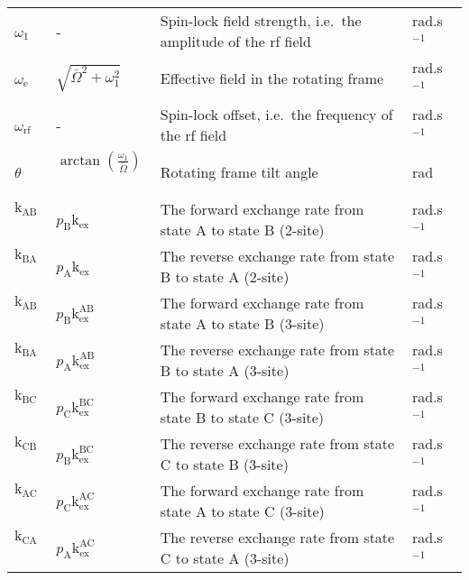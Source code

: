 \documentclass[a4paper,11pt,twoside,openright]{book}
\begin{document}
{\begin{landscape}
\begin{center}
\begin{small}
\begin{longtable}{llll}
$\omega_1 $\         & -                              & Spin-lock field strength, i.e.\ the amplitude of the rf field                 & rad.s$^{-1}$\  \\
$\omega_{\textrm{e}}$\           & $\sqrt{\bar\Omega ^2 + \omega_1 ^2}$\   & Effective field in the rotating frame                                   & rad.s$^{-1}$\  \\
$\omega_{\textrm{rf}}$\          & -                              & Spin-lock offset, i.e.\ the frequency of the rf field                         & rad.s$^{-1}$\  \\
$\theta$\            & $\arctan \left( \frac{\omega_1 }{\bar\Omega } \right)$\   & Rotating frame tilt angle                             & rad \\
$\textrm{k}_{\textrm{AB}}$\              & $p_{\textrm{B}}\textrm{k}_{\textrm{ex}}$\                       & The forward exchange rate from state A to state B (2-site)                    & rad.s$^{-1}$\  \\
$\textrm{k}_{\textrm{BA}}$\              & $p_{\textrm{A}}\textrm{k}_{\textrm{ex}}$\                       & The reverse exchange rate from state B to state A (2-site)                    & rad.s$^{-1}$\  \\
$\textrm{k}_{\textrm{AB}}$\              & $p_{\textrm{B}}\textrm{k}_{\textrm{ex}}^{\textrm{AB}}$\                     & The forward exchange rate from state A to state B (3-site)                    & rad.s$^{-1}$\  \\
$\textrm{k}_{\textrm{BA}}$\              & $p_{\textrm{A}}\textrm{k}_{\textrm{ex}}^{\textrm{AB}}$\                     & The reverse exchange rate from state B to state A (3-site)                    & rad.s$^{-1}$\  \\
$\textrm{k}_{\textrm{BC}}$\              & $p_{\textrm{C}}\textrm{k}_{\textrm{ex}}^{\textrm{BC}}$\                     & The forward exchange rate from state B to state C (3-site)                    & rad.s$^{-1}$\  \\
$\textrm{k}_{\textrm{CB}}$\              & $p_{\textrm{B}}\textrm{k}_{\textrm{ex}}^{\textrm{BC}}$\                     & The reverse exchange rate from state C to state B (3-site)                    & rad.s$^{-1}$\  \\
$\textrm{k}_{\textrm{AC}}$\              & $p_{\textrm{C}}\textrm{k}_{\textrm{ex}}^{\textrm{AC}}$\                     & The forward exchange rate from state A to state C (3-site)                    & rad.s$^{-1}$\  \\
$\textrm{k}_{\textrm{CA}}$\              & $p_{\textrm{A}}\textrm{k}_{\textrm{ex}}^{\textrm{AC}}$\                     & The reverse exchange rate from state C to state A (3-site)                    & rad.s$^{-1}$\  \\

\end{longtable}
\end{small}
\end{center}
\end{landscape}}
\end{document}
